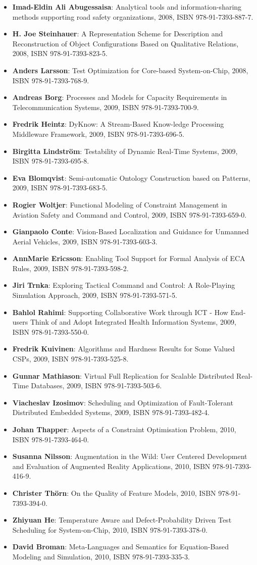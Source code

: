 \documentclass[a4paper,showtrims,twocolumn]{memoir}
\newenvironment{theses}
  {
    \begin{itemize}
      \setlength{\itemsep}{0.2em}
      \setlength{\parskip}{0em}
      \setlength{\parsep}{0em}
  }
  {
    \end{itemize}
  }
\newcommand{\thesis}[5]{\item[No. #1] \textbf{#2}: #3, #4, ISBN #5.}
\begin{document}
\begin{theses}
    \thesis{1187}{Imad-Eldin Ali Abugessaisa}{Analytical tools and information-sharing methods supporting road safety organizations}{2008}{978-91-7393-887-7}
    \thesis{1204}{H. Joe Steinhauer}{A Representation Scheme for Description and Reconstruction of Object Configurations Based on Qualitative Relations}{2008}{978-91-7393-823-5}
    \thesis{1222}{Anders Larsson}{Test Optimization for Core-based System-on-Chip}{2008}{978-91-7393-768-9}
    \thesis{1238}{Andreas Borg}{Processes and Models for Capacity Requirements in Telecommunication Systems}{2009}{978-91-7393-700-9}
    \thesis{1240}{Fredrik Heintz}{DyKnow: A Stream-Based Know-ledge Processing Middleware Framework}{2009}{978-91-7393-696-5}
    \thesis{1241}{Birgitta Lindström}{Testability of Dynamic Real-Time Systems}{2009}{978-91-7393-695-8}
    \thesis{1244}{Eva Blomqvist}{Semi-automatic Ontology Construction based on Patterns}{2009}{978-91-7393-683-5}
    \thesis{1249}{Rogier Woltjer}{Functional Modeling of Constraint Management in Aviation Safety and Command and Control}{2009}{978-91-7393-659-0}
    \thesis{1260}{Gianpaolo Conte}{Vision-Based Localization and Guidance for Unmanned Aerial Vehicles}{2009}{978-91-7393-603-3}
    \thesis{1262}{AnnMarie Ericsson}{Enabling Tool Support for Formal Analysis of ECA Rules}{2009}{978-91-7393-598-2}
    \thesis{1266}{Jiri Trnka}{Exploring Tactical Command and Control: A Role-Playing Simulation Approach}{2009}{978-91-7393-571-5}
    \thesis{1268}{Bahlol Rahimi}{Supporting Collaborative Work through ICT - How End-users Think of and Adopt Integrated Health Information Systems}{2009}{978-91-7393-550-0}
    \thesis{1274}{Fredrik Kuivinen}{Algorithms and Hardness Results for Some Valued CSPs}{2009}{978-91-7393-525-8}
    \thesis{1281}{Gunnar Mathiason}{Virtual Full Replication for Scalable Distributed Real-Time Databases}{2009}{978-91-7393-503-6}
    \thesis{1290}{Viacheslav Izosimov}{Scheduling and Optimization of Fault-Tolerant Distributed Embedded Systems}{2009}{978-91-7393-482-4}
    \thesis{1294}{Johan Thapper}{Aspects of a Constraint Optimisation Problem}{2010}{978-91-7393-464-0}
    \thesis{1306}{Susanna Nilsson}{Augmentation in the Wild: User Centered Development and Evaluation of Augmented Reality Applications}{2010}{978-91-7393-416-9}
    \thesis{1313}{Christer Thörn}{On the Quality of Feature Models}{2010}{978-91-7393-394-0}
    \thesis{1321}{Zhiyuan He}{Temperature Aware and Defect-Probability Driven Test Scheduling for System-on-Chip}{2010}{978-91-7393-378-0}
    \thesis{1333}{David Broman}{Meta-Languages and Semantics for Equation-Based Modeling and Simulation}{2010}{978-91-7393-335-3}

\end{theses}
\end{document}
